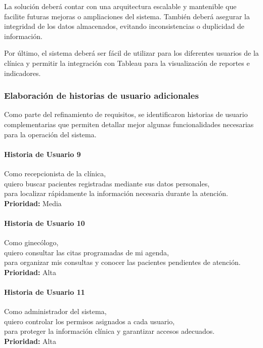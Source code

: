 \documentclass[12pt,letterpaper]{article}
\begin{document}
La solución deberá contar con una arquitectura escalable y mantenible que facilite futuras
mejoras o ampliaciones del sistema. También deberá asegurar la integridad de los datos
almacenados, evitando inconsistencias o duplicidad de información.

Por último, el sistema deberá ser fácil de utilizar para los diferentes usuarios de la clínica y
permitir la integración con Tableau para la visualización de reportes e indicadores.

\subsubsection*{Elaboración de historias de usuario adicionales}

Como parte del refinamiento de requisitos, se identificaron historias de usuario
complementarias que permiten detallar mejor algunas funcionalidades necesarias para la
operación del sistema.

\paragraph{Historia de Usuario 9}
Como recepcionista de la clínica,\\
quiero buscar pacientes registradas mediante sus datos personales,\\
para localizar rápidamente la información necesaria durante la atención.\\
\textbf{Prioridad:} Media

\paragraph{Historia de Usuario 10}
Como ginecólogo,\\
quiero consultar las citas programadas de mi agenda,\\
para organizar mis consultas y conocer las pacientes pendientes de atención.\\
\textbf{Prioridad:} Alta

\paragraph{Historia de Usuario 11}
Como administrador del sistema,\\
quiero controlar los permisos asignados a cada usuario,\\
para proteger la información clínica y garantizar accesos adecuados.\\
\textbf{Prioridad:} Alta
\end{document}
